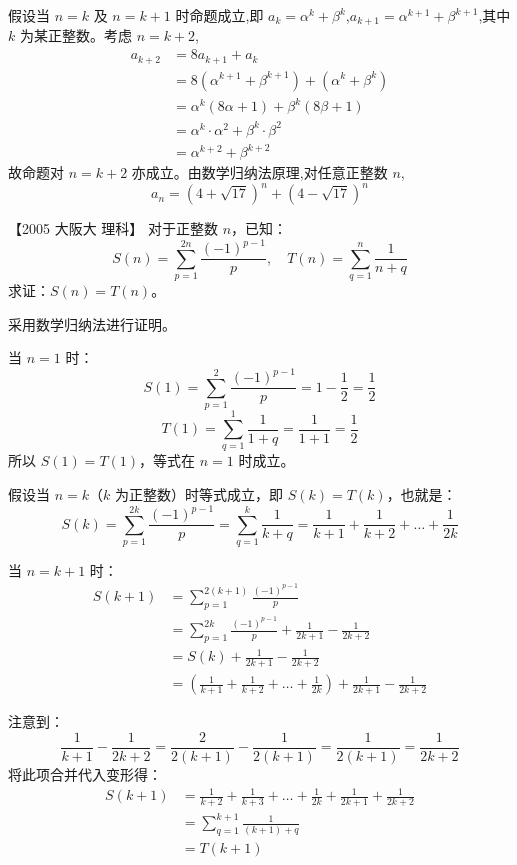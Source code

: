 \begin{questions}
\begin{solution}
假设当 $n=k$ 及 $n=k+1$ 时命题成立,即 $a_{k}=\alpha^{k}+\beta^{k}$,$a_{k+1}=\alpha^{k+1}+\beta^{k+1}$,其中 $k$ 为某正整数。考虑 $n=k+2$,
\begin{align*}
a_{k+2}&=8a_{k+1}+a_{k}\\
&=8\left(\alpha^{k+1}+\beta^{k+1}\right)+\left(\alpha^{k}+\beta^{k}\right)\\
&=\alpha^{k}\left(8\alpha+1\right)+\beta^{k}\left(8\beta+1\right)\\
&=\alpha^{k}\cdot\alpha^{2}+\beta^{k}\cdot\beta^{2}\\
&=\alpha^{k+2}+\beta^{k+2}
\end{align*}
故命题对 $n=k+2$ 亦成立。由数学归纳法原理,对任意正整数 $n$,
\[
a_{n}=\left(4+\sqrt{17}\right)^{n}+\left(4-\sqrt{17}\right)^{n}
\]
\end{solution}

    \question
【2005 大阪大 理科】
对于正整数 $n$，已知：
\[
S(n) = \sum_{p=1}^{2n} \frac{(-1)^{p-1}}{p}, \quad T(n) = \sum_{q=1}^{n} \frac{1}{n+q}
\]
求证：$S(n) = T(n)$。

\begin{solution}
采用数学归纳法进行证明。

当 $n = 1$ 时：
\[
S(1) = \sum_{p=1}^{2} \frac{(-1)^{p-1}}{p} = 1 - \frac{1}{2} = \frac{1}{2}
\]
\[
T(1) = \sum_{q=1}^{1} \frac{1}{1+q} = \frac{1}{1+1} = \frac{1}{2}
\]
所以 $S(1) = T(1)$，等式在 $n = 1$ 时成立。

假设当 $n = k$（$k$ 为正整数）时等式成立，即 $S(k) = T(k)$，也就是：
\[
S(k) = \sum_{p=1}^{2k} \frac{(-1)^{p-1}}{p} = \sum_{q=1}^{k} \frac{1}{k+q} = \frac{1}{k+1} + \frac{1}{k+2} + \dots + \frac{1}{2k}
\]

当 $n = k+1$ 时：
\begin{align*}
S(k+1) &= \sum_{p=1}^{2(k+1)} \frac{(-1)^{p-1}}{p} \\
&= \sum_{p=1}^{2k} \frac{(-1)^{p-1}}{p} + \frac{1}{2k+1} - \frac{1}{2k+2} \\
&= S(k) + \frac{1}{2k+1} - \frac{1}{2k+2} \\
&= \left( \frac{1}{k+1} + \frac{1}{k+2} + \dots + \frac{1}{2k} \right) + \frac{1}{2k+1} - \frac{1}{2k+2}
\end{align*}

注意到：
\[
\frac{1}{k+1} - \frac{1}{2k+2} = \frac{2}{2(k+1)} - \frac{1}{2(k+1)} = \frac{1}{2(k+1)} = \frac{1}{2k+2}
\]
将此项合并代入变形得：
\begin{align*}
S(k+1) &= \frac{1}{k+2} + \frac{1}{k+3} + \dots + \frac{1}{2k} + \frac{1}{2k+1} + \frac{1}{2k+2} \\
&= \sum_{q=1}^{k+1} \frac{1}{(k+1)+q} \\
&= T(k+1)
\end{align*}


\end{solution}
\end{questions}
